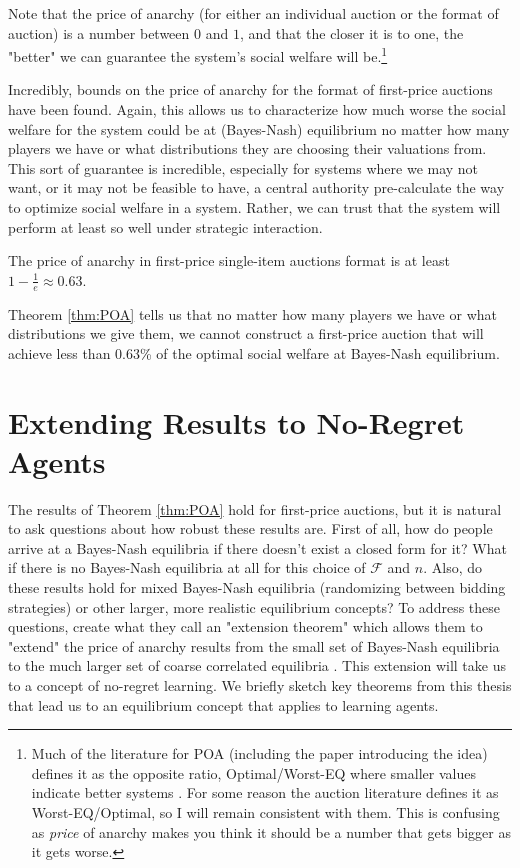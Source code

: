 \documentclass[12pt,twoside]{reedthesis}
\begin{document}
Note that the price of anarchy (for either an individual auction or the format of auction) is a number between $0$ and $1$, and that the closer it is to one, the "better" we can guarantee the system's social welfare will be.\footnote{Much of the literature for POA (including the paper introducing the idea) defines it as the opposite ratio, Optimal/Worst-EQ where smaller values indicate better systems \citep{Koutsoupias1999}. For some reason the auction literature defines it as Worst-EQ/Optimal, so I will remain consistent with them. This is confusing as {\em price} of anarchy makes you think it should be a number that gets bigger as it gets worse.}

Incredibly, bounds on the price of anarchy for the format of first-price auctions have been found. Again, this allows us to characterize how much worse the social welfare for the system could be at (Bayes-Nash) equilibrium no matter how many players we have or what distributions they are choosing their valuations from. This sort of guarantee is incredible, especially for systems where we may not want, or it may not be feasible to have, a central authority pre-calculate the way to optimize social welfare in a system. Rather, we can trust that the system will perform at least so well under strategic interaction.

\begin{theorem}{\citep{Syrgkanis2013}}
	The price of anarchy in first-price single-item auctions format is at least $1-\frac{1}{e} \approx 0.63$.
	\label{thm:POA}	
\end{theorem}

Theorem \ref{thm:POA} tells us that no matter how many players we have or what distributions we give them, we cannot construct a first-price auction that will achieve less than $0.63$\% of the optimal social welfare at Bayes-Nash equilibrium. 
 
\section{Extending Results to No-Regret Agents}
The results of Theorem \ref{thm:POA} hold for first-price auctions, but it is natural to ask questions about how robust these results are. First of all, how do people arrive at a Bayes-Nash equilibria if there doesn't exist a closed form for it? What if there is no Bayes-Nash equilibria at all for this choice of $\mathcal{F}$ and $n$. Also, do these results hold for mixed Bayes-Nash equilibria (randomizing between bidding strategies) or other larger, more realistic equilibrium concepts? To address these questions, \cite{Roughgarden2017} create what they call an "extension theorem" which allows them to "extend" the price of anarchy results from the small set of Bayes-Nash equilibria to the much larger set of coarse correlated equilibria \citep[p.~60]{Roughgarden2017}. This extension will take us to a concept of no-regret learning. We briefly sketch key theorems from this thesis that lead us to an equilibrium concept that applies to learning agents.
\end{document}
